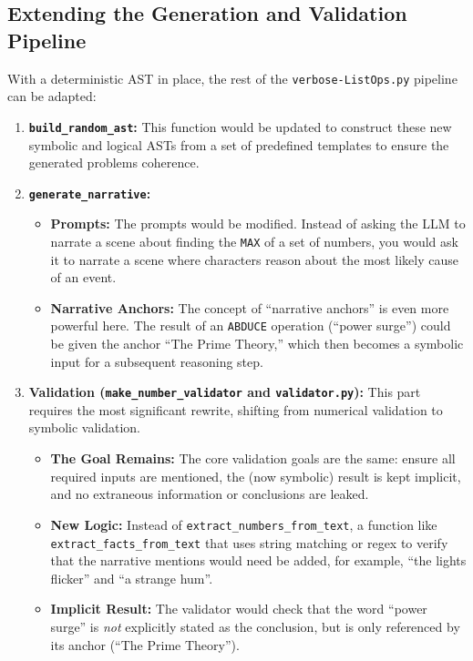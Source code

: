 \documentclass{article}
\begin{document}
\subsection{Extending the Generation and Validation Pipeline}

With a deterministic AST in place, the rest of the \texttt{verbose-ListOps.py} pipeline can be adapted:

\begin{enumerate}
  \item \textbf{\texttt{build\_random\_ast}:} This function would be updated to construct these new symbolic and logical ASTs from a set of predefined templates to ensure the generated problems coherence.

  \item \textbf{\texttt{generate\_narrative}:}
        \begin{itemize}
          \item \textbf{Prompts:} The prompts would be modified. Instead of asking the LLM to narrate a scene about finding the \texttt{MAX} of a set of numbers, you would ask it to narrate a scene where characters reason about the most likely cause of an event.
          \item \textbf{Narrative Anchors:} The concept of ``narrative anchors'' is even more powerful here. The result of an \texttt{ABDUCE} operation (``power surge'') could be given the anchor ``The Prime Theory,'' which then becomes a symbolic input for a subsequent reasoning step.
        \end{itemize}

  \item \textbf{Validation (\texttt{make\_number\_validator} and \texttt{validator.py}):} This part requires the most significant rewrite, shifting from numerical validation to symbolic validation.
        \begin{itemize}
          \item \textbf{The Goal Remains:} The core validation goals are the same: ensure all required inputs are mentioned, the (now symbolic) result is kept implicit, and no extraneous information or conclusions are leaked.
          \item \textbf{New Logic:} Instead of \texttt{extract\_numbers\_from\_text}, a function like \texttt{extract\_facts\_from\_text} that uses string matching or regex to verify that the narrative mentions would need be added, for example, ``the lights flicker'' and ``a strange hum''.
          \item \textbf{Implicit Result:} The validator would check that the word ``power surge'' is \textit{not} explicitly stated as the conclusion, but is only referenced by its anchor (``The Prime Theory'').
        \end{itemize}
\end{enumerate}
\end{document}

